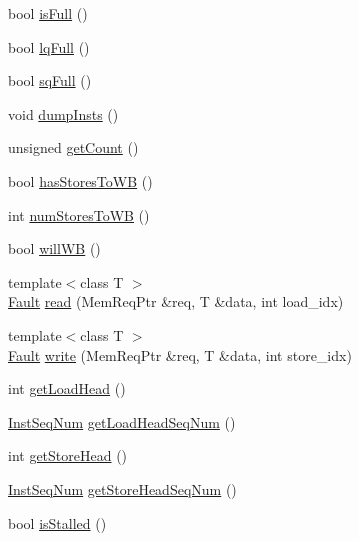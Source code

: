 \begin{DoxyCompactItemize}
bool \hyperlink{classOzoneLSQ_a3e70330939fdfc4dbc2f60c1a660584d}{isFull} ()
\item 
bool \hyperlink{classOzoneLSQ_a5893daf623130be826f492bbff58f757}{lqFull} ()
\item 
bool \hyperlink{classOzoneLSQ_a477981d1f905d2d398a1527f7149e3c4}{sqFull} ()
\item 
void \hyperlink{classOzoneLSQ_a80587b4fe043bbe1995536cb3b361588}{dumpInsts} ()
\item 
unsigned \hyperlink{classOzoneLSQ_a24ba9cb3fa1e726321780a20a960c8cd}{getCount} ()
\item 
bool \hyperlink{classOzoneLSQ_ad2e4b46255cfb53e85522adeed4e2089}{hasStoresToWB} ()
\item 
int \hyperlink{classOzoneLSQ_a276cdbdaf4551f1b846c4e2535c5f882}{numStoresToWB} ()
\item 
bool \hyperlink{classOzoneLSQ_a338be821734603396bfef8d9fb8f04b0}{willWB} ()
\item 
{\footnotesize template$<$class T $>$ }\\\hyperlink{classRefCountingPtr}{Fault} \hyperlink{classOzoneLSQ_ad2981b6704bca036af0723daaaebe57e}{read} (MemReqPtr \&req, T \&data, int load\_\-idx)
\item 
{\footnotesize template$<$class T $>$ }\\\hyperlink{classRefCountingPtr}{Fault} \hyperlink{classOzoneLSQ_a173162a41482ee35c5a15394b4befa4b}{write} (MemReqPtr \&req, T \&data, int store\_\-idx)
\item 
int \hyperlink{classOzoneLSQ_ad43a7408f4e1c1e181bc40ecab6dc593}{getLoadHead} ()
\item 
\hyperlink{inst__seq_8hh_a258d93d98edaedee089435c19ea2ea2e}{InstSeqNum} \hyperlink{classOzoneLSQ_aee7352adadc6b43b7ce36a8c052eb222}{getLoadHeadSeqNum} ()
\item 
int \hyperlink{classOzoneLSQ_ab9d14b0deb8ab44dc09ac784b162e774}{getStoreHead} ()
\item 
\hyperlink{inst__seq_8hh_a258d93d98edaedee089435c19ea2ea2e}{InstSeqNum} \hyperlink{classOzoneLSQ_a1813b58ab7569d6aeefb5d4e235cceda}{getStoreHeadSeqNum} ()
\item 
bool \hyperlink{classOzoneLSQ_af8eb8590fbfa6ecd2f796390677a4c00}{isStalled} ()
\end{DoxyCompactItemize}

